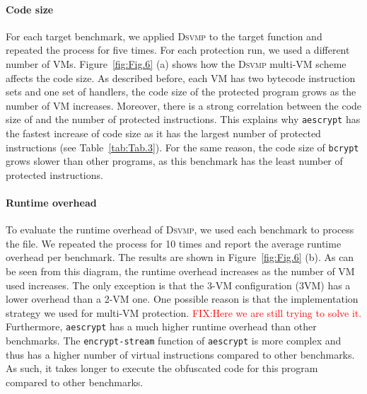 \documentclass[conference]{IEEEtran}
\newcommand{\DSVMP}{\textsc{Dsvmp}\xspace}
\newcommand\FIXME[1]{\textcolor{red}{FIX:}\textcolor{red}{#1}}
\begin{document}
\paragraph*{Code size} For each target benchmark, we applied \DSVMP to the target function and repeated the process for five times. For each protection run, we used a different number of VMs. Figure~\ref{fig:Fig.6} (a) shows how the \DSVMP multi-VM scheme affects the code size.
 As described before, each VM has two bytecode instruction sets and one set of handlers, the code size of the protected program grows as the number of VM increases. Moreover, there is a strong correlation between the code size of and the number of protected instructions.  This explains why \texttt{aescrypt} has the fastest increase of code size as it has the largest number of protected instructions (see Table~\ref{tab:Tab.3}). For the same reason, the code size of \texttt{bcrypt} grows slower than other programs, as this benchmark has the least number of protected instructions.

\paragraph*{Runtime overhead} To evaluate the runtime overhead of \DSVMP, we used each benchmark to process the file. We repeated the process for 10 times and report the average runtime overhead per benchmark. The results are shown in Figure~\ref{fig:Fig.6} (b).
As can be seen from this diagram, the runtime overhead increases as the number of VM used increases. The only exception is that the 3-VM configuration (3VM) has a lower overhead than a 2-VM one. One possible reason is that the implementation strategy we used for multi-VM protection. \FIXME{Here we are still trying to solve it.}
Furthermore, \texttt{aescrypt} has a much higher runtime overhead than other benchmarks. The \texttt{encrypt-stream} function of  \texttt{aescrypt} is  more complex and thus has a higher number of virtual instructions compared to other benchmarks. As such, it takes longer to execute the obfuscated code for this program compared to other benchmarks.
\end{document}
